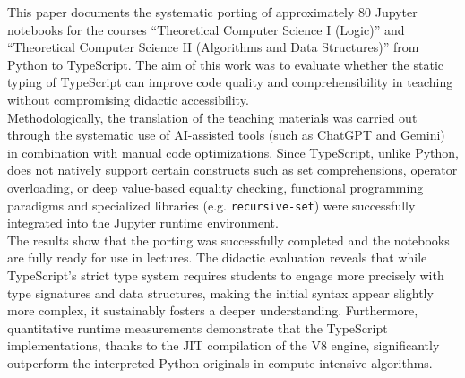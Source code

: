 This paper documents the systematic porting of approximately 80 Jupyter notebooks for the courses \enquote{Theoretical Computer Science I (Logic)} and \enquote{Theoretical Computer Science II (Algorithms and Data Structures)} from Python to TypeScript. The aim of this work was to evaluate whether the static typing of TypeScript can improve code quality and comprehensibility in teaching without compromising didactic accessibility.\\
Methodologically, the translation of the teaching materials was carried out through the systematic use of \ac{AI}-assisted tools (such as ChatGPT and Gemini) in combination with manual code optimizations. Since TypeScript, unlike Python, does not natively support certain constructs such as set comprehensions, operator overloading, or deep value-based equality checking, functional programming paradigms and specialized libraries (e.g. \texttt{recursive-set}) were successfully integrated into the Jupyter runtime environment.\\
The results show that the porting was successfully completed and the notebooks are fully ready for use in lectures. The didactic evaluation reveals that while TypeScript's strict type system requires students to engage more precisely with type signatures and data structures, making the initial syntax appear slightly more complex, it sustainably fosters a deeper understanding. Furthermore, quantitative runtime measurements demonstrate that the TypeScript implementations, thanks to the JIT compilation of the V8 engine, significantly outperform the interpreted Python originals in compute-intensive algorithms.
